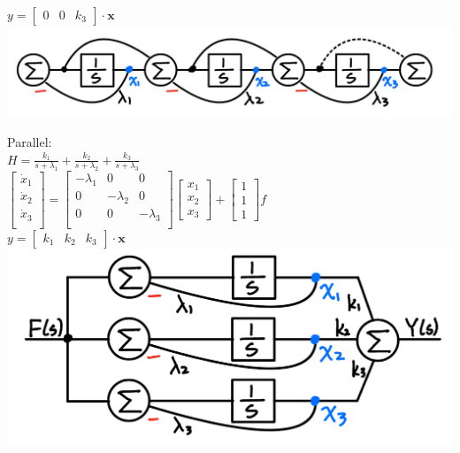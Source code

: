 \documentclass[4pt]{article}
\theoremstyle{definition}
\theoremstyle{definition}
\begin{document}
\begin{landscape}
\begin{multicols}{3}
    \(y =
    \begin{bmatrix}
        0 & 0 & k_3       %
    \end{bmatrix}
    \cdot \mathbf x
    \)
    \includegraphics[width=\linewidth]{figures/cascade.jpg}

    Parallel:\\
    \(H = \frac{k_1}{s+\lambda_1} + \frac{k_2}{s+\lambda_2} + \frac{k_3}{s+\lambda_3}\)\\
    \(
    \begin{bmatrix}
        \dot{x}_1\\
        \dot{x}_2\\
        \dot{x}_3\\
    \end{bmatrix}
    =
    \begin{bmatrix}
        -\lambda_1 & 0 & 0\\
        0 & -\lambda_2 & 0\\
        0 & 0 & -\lambda_3\\    %
    \end{bmatrix}
    \begin{bmatrix}
        x_1\\
        x_2\\
        x_3
    \end{bmatrix}
    +
    \begin{bmatrix}
        1\\1\\1         %
    \end{bmatrix}
    f
    \)\\

    \(y =
    \begin{bmatrix}
        k_1 & k_2 & k_3       %
    \end{bmatrix}
    \cdot \mathbf x
    \)
    \includegraphics[width=0.75\linewidth]{figures/parallel.jpg}



\end{multicols}
\end{landscape}
\end{document}
